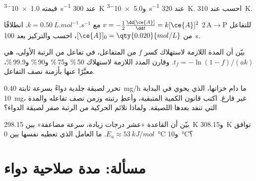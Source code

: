 \begin{exercise}[$\star\star$]\label{exo:b1:rate-laws:8}
 قيمته \qty{1.0e-3}{s^{-1}} عند \qty{300}{K}
و\qty{5.0e-3}{s^{-1}} عند \qty{320}{K}. احسب 
 عند \qty{310}{K}.
\end{exercise}

\begin{exercise}[$\star\star$]\label{exo:b1:rate-laws:9}
للتفاعل $2\,\mathrm{A} \longrightarrow \mathrm{P}$  $v = -\frac12\frac{\dd[\ce{A}]}
{\dd t} = k[\ce{A}]^2$ مع $k = \qty{0.50}{L.mol^{-1}.s^{-1}}$. انطلاقًا
من $[\ce{A}]_0 = \qty{0.020}{mol/L}$، احسب 
والتركيز بعد \qty{100}{s}.
\end{exercise}

\begin{exercise}[$\star\star\star$]\label{exo:b1:rate-laws:10}
بيّن أن المدة اللازمة لاستهلاك كسر $f$ من المتفاعل، في تفاعل من الرتبة الأولى،
هي $t_f = -\ln(1 - f)/(ak)$. وقارن
المدد اللازمة لاستهلاك 50\,\% و75\,\% و90\,\% و99.9\,\%، معبَّرًا عنها بأزمنة نصف التفاعل.
\end{exercise}

\begin{exercise}[$\star\star\star$]\label{exo:b1:rate-laws:11}
تحرر لصيقة جلدية دواءً بسرعة ثابتة
\qty{0.40}{mg/h} ما دام خزانها، الذي يحوي في البداية \qty{10}{mg}، غير
فارغ. اكتب قانون الكمية المتبقية، وأعطِ رتبته وزمن نصف تفاعله
والمدة التي تنفد بعدها اللصيقة. ولماذا تلائم الحركية من الرتبة صفر
لصيقة الدواء؟
\end{exercise}

\begin{exercise}[$\star\star\star$]\label{exo:b1:rate-laws:12}
بيّن أن القاعدة «عشر درجات زيادة، سرعة مضاعفة» بين
\qty{298.15}{K} و\qty{308.15}{K} توافق $E_a \approx
\qty{53}{kJ/mol}$. ما العامل الذي تعطيه  نفسها
بين \qty{0}{\celsius} و\qty{10}{\celsius}؟
\end{exercise}

\section{مسألة: مدة صلاحية دواء}

